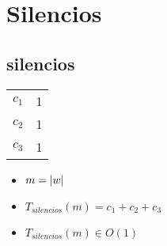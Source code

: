 \documentclass{article}
\begin{document}
    \section*{Silencios}

    \subsection*{silencios}

    \begin{minipage}{0.70\textwidth}
        
    \end{minipage}
    \hfill
    \begin{minipage}{0.25\textwidth}
        \begin{tabular}{|c|c}
            $c_1$ & 1 \\
            $c_2$ & 1 \\
            $c_3$ & 1 \\
        \end{tabular}
    \end{minipage}

    \begin{itemize}
        \item $m = |w|$
        \item $T_{silencios}(m) = c_1 + c_2 + c_3 $
        \item $T_{silencios}(m) \in O(1)$
    \end{itemize}
\end{document}
